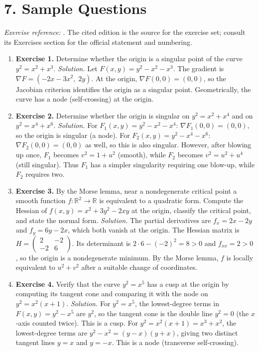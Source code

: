\section*{7. Sample Questions}
\emph{Exercise reference:} \cite{singularity_ref1}. The cited edition is the source for the exercise set; consult its Exercises section for the official statement and numbering.
\begin{enumerate}[leftmargin=*,itemsep=0.9em]
\item \textbf{Exercise 1.} Determine whether the origin is a singular point of the curve $y^2 = x^2 + x^3$. \emph{Solution.} Let $F(x,y) = y^2 - x^2 - x^3$. The gradient is $\nabla F = (-2x - 3x^2,\; 2y)$. At the origin, $\nabla F(0,0) = (0,0)$, so the Jacobian criterion identifies the origin as a singular point. Geometrically, the curve has a node (self-crossing) at the origin.

\item \textbf{Exercise 2.} Determine whether the origin is singular on $y^2 = x^2 + x^4$ and on $y^2 = x^4 + x^6$. \emph{Solution.} For $F_1(x,y) = y^2 - x^2 - x^4$: $\nabla F_1(0,0) = (0,0)$, so the origin is singular (a node). For $F_2(x,y) = y^2 - x^4 - x^6$: $\nabla F_2(0,0) = (0,0)$ as well, so this is also singular. However, after blowing up once, $F_1$ becomes $v^2 = 1 + u^2$ (smooth), while $F_2$ becomes $v^2 = u^2 + u^4$ (still singular). Thus $F_1$ has a simpler singularity requiring one blow-up, while $F_2$ requires two.

\item \textbf{Exercise 3.} By the Morse lemma, near a nondegenerate critical point a smooth function $f\colon\mathbb{R}^2\to\mathbb{R}$ is equivalent to a quadratic form. Compute the Hessian of $f(x,y) = x^2 + 3y^2 - 2xy$ at the origin, classify the critical point, and state the normal form. \emph{Solution.} The partial derivatives are $f_x = 2x - 2y$ and $f_y = 6y - 2x$, which both vanish at the origin. The Hessian matrix is $H = \begin{pmatrix} 2 & -2 \\ -2 & 6 \end{pmatrix}$. Its determinant is $2 \cdot 6 - (-2)^2 = 8 > 0$ and $f_{xx} = 2 > 0$, so the origin is a nondegenerate minimum. By the Morse lemma, $f$ is locally equivalent to $u^2 + v^2$ after a suitable change of coordinates.

\item \textbf{Exercise 4.} Verify that the curve $y^2 = x^5$ has a cusp at the origin by computing its tangent cone and comparing it with the node on $y^2 = x^2(x+1)$. \emph{Solution.} For $y^2 = x^5$, the lowest-degree terms in $F(x,y) = y^2 - x^5$ are $y^2$, so the tangent cone is the double line $y^2 = 0$ (the $x$-axis counted twice). This is a cusp. For $y^2 = x^2(x+1) = x^3 + x^2$, the lowest-degree terms are $y^2 - x^2 = (y-x)(y+x)$, giving two distinct tangent lines $y = x$ and $y = -x$. This is a node (transverse self-crossing).


\end{enumerate}
